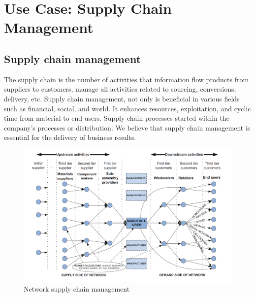 \chapter{Use Case: Supply Chain Management}
\section{Supply chain management}
The supply chain is the number of activities that information flow products from suppliers to customers, manage all activities related to sourcing, conversions, delivery, etc. Supply chain management, not only is beneficial in various fields such as financial, social, and world. It enhances resources, exploitation, and cyclic time from material to end-users.
Supply chain processes started within the company’s processes or distribution. We believe that supply chain management is essential for the delivery of business results\cite{Wu}.
\begin{center}
	\begin{figure}[htb!]
		\begin{minipage}{0.50\linewidth}
			
			\includegraphics[width=1.85\textwidth]{images/chap03_SCM_network.png}
		\end{minipage}
		\caption{Network supply chain management\cite{Sajter}}    
	\end{figure}    
\end{center}

